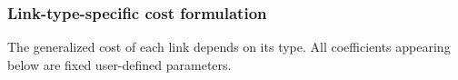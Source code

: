 \subsubsection{Link-type-specific cost formulation}

The generalized cost of each link depends on its type. All coefficients
appearing below are fixed user-defined parameters.

